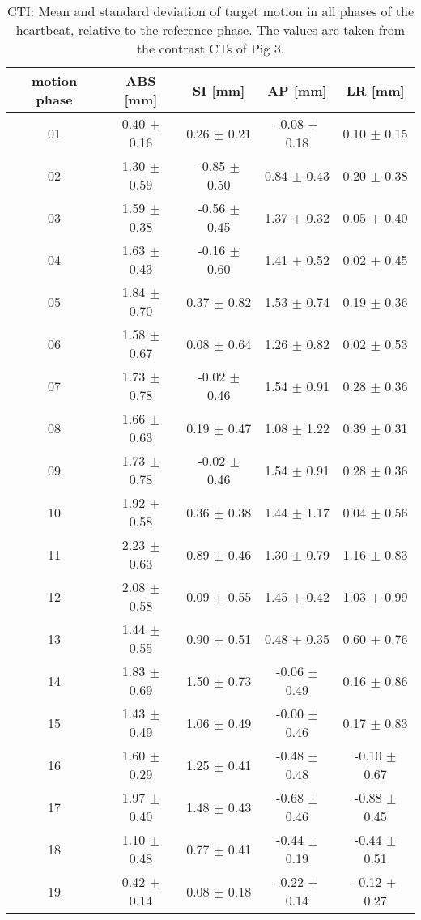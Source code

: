 \begin{table}[H]
  \centering
  \scriptsize
  \caption{CTI: Mean and standard deviation of target motion in all phases of the heartbeat, relative to the reference phase. The values are 
  taken from the contrast CTs of Pig 3.}
  \begin{tabular}{|c|c|c|c|c|}
    \hline\hline
    motion phase\rule{0pt}{2.6ex}\rule[-1.2ex]{0pt}{0pt} & ABS [mm] & SI [mm] & AP [mm] & LR [mm]\\
    \hline
01 &0.40 $\pm$ 0.16 &0.26 $\pm$ 0.21 &-0.08 $\pm$ 0.18 &0.10 $\pm$ 0.15 \\
02 &1.30 $\pm$ 0.59 &-0.85 $\pm$ 0.50 &0.84 $\pm$ 0.43 &0.20 $\pm$ 0.38 \\
03 &1.59 $\pm$ 0.38 &-0.56 $\pm$ 0.45 &1.37 $\pm$ 0.32 &0.05 $\pm$ 0.40 \\
04 &1.63 $\pm$ 0.43 &-0.16 $\pm$ 0.60 &1.41 $\pm$ 0.52 &0.02 $\pm$ 0.45 \\
05 &1.84 $\pm$ 0.70 &0.37 $\pm$ 0.82 &1.53 $\pm$ 0.74 &0.19 $\pm$ 0.36 \\
06 &1.58 $\pm$ 0.67 &0.08 $\pm$ 0.64 &1.26 $\pm$ 0.82 &0.02 $\pm$ 0.53 \\
07 &1.73 $\pm$ 0.78 &-0.02 $\pm$ 0.46 &1.54 $\pm$ 0.91 &0.28 $\pm$ 0.36 \\
08 &1.66 $\pm$ 0.63 &0.19 $\pm$ 0.47 &1.08 $\pm$ 1.22 &0.39 $\pm$ 0.31 \\
09 &1.73 $\pm$ 0.78 &-0.02 $\pm$ 0.46 &1.54 $\pm$ 0.91 &0.28 $\pm$ 0.36 \\
10 &1.92 $\pm$ 0.58 &0.36 $\pm$ 0.38 &1.44 $\pm$ 1.17 &0.04 $\pm$ 0.56 \\
11 &2.23 $\pm$ 0.63 &0.89 $\pm$ 0.46 &1.30 $\pm$ 0.79 &1.16 $\pm$ 0.83 \\
12 &2.08 $\pm$ 0.58 &0.09 $\pm$ 0.55 &1.45 $\pm$ 0.42 &1.03 $\pm$ 0.99 \\
13 &1.44 $\pm$ 0.55 &0.90 $\pm$ 0.51 &0.48 $\pm$ 0.35 &0.60 $\pm$ 0.76 \\
14 &1.83 $\pm$ 0.69 &1.50 $\pm$ 0.73 &-0.06 $\pm$ 0.49 &0.16 $\pm$ 0.86 \\
15 &1.43 $\pm$ 0.49 &1.06 $\pm$ 0.49 &-0.00 $\pm$ 0.46 &0.17 $\pm$ 0.83 \\
16 &1.60 $\pm$ 0.29 &1.25 $\pm$ 0.41 &-0.48 $\pm$ 0.48 &-0.10 $\pm$ 0.67 \\
17 &1.97 $\pm$ 0.40 &1.48 $\pm$ 0.43 &-0.68 $\pm$ 0.46 &-0.88 $\pm$ 0.45 \\
18 &1.10 $\pm$ 0.48 &0.77 $\pm$ 0.41 &-0.44 $\pm$ 0.19 &-0.44 $\pm$ 0.51 \\
19 &0.42 $\pm$ 0.14 &0.08 $\pm$ 0.18 &-0.22 $\pm$ 0.14 &-0.12 $\pm$ 0.27 \\
    \hline\hline
  \end{tabular}
  \label{tab:motion:CTI:Pig3}
\end{table}

